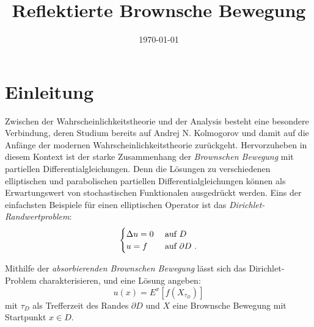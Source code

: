 \documentclass[10pt, a4paper, leqno, twoside, bibliography=totocnumbered, final]{scrartcl}
\date{\today}
\title{Reflektierte Brownsche Bewegung}
\theoremstyle{definition}
\theoremstyle{plain}%
\theoremstyle{remark}
\begin{document}
\maketitle

\tableofcontents

\newpage

\section{Einleitung}

Zwischen der Wahrscheinlichkeitstheorie und der Analysis besteht eine besondere Verbindung, deren Studium bereits auf Andrej N. Kolmogorov und damit auf die Anfänge der modernen Wahrscheinlichkeitstheorie zurückgeht. Hervorzuheben in diesem Kontext ist der starke Zusammenhang der \emph{Brownschen Bewegung} mit partiellen Differentialgleichungen. Denn die Lösungen zu verschiedenen elliptischen und parabolischen partiellen Differentialgleichungen können als Erwartungswert von stochastischen Funktionalen ausgedrückt werden. Eins der einfachsten Beispiele für einen elliptischen Operator ist das \emph{Dirichlet-Randwertproblem}:
\begin{equation}
\begin{cases}
\Delta u  = 0 & \text{ auf $D$ }\\
 u  = f & \text{ auf $ \partial D $ }.
\end{cases}
\end{equation}

Mithilfe der \emph{absorbierenden Brownschen Bewegung} lässt sich das Dirichlet-Problem charakterisieren, und eine Lösung angeben:
\begin{equation}
u(x) = E^x \left[ f(X_{\tau_D})\right]
\end{equation}
mit $ \tau_D $ als Trefferzeit des Randes $ \partial D $ und $ X $ eine Brownsche Bewegung mit Startpunkt $ x \in D $.
\end{document}
